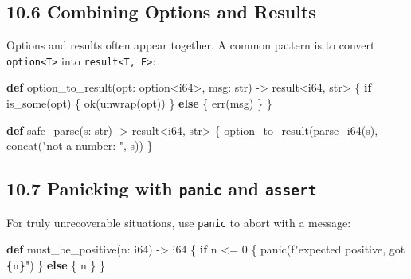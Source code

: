 \documentclass[
  english,
]{book}
\newenvironment{Shaded}{\begin{snugshade}}{\end{snugshade}}
\newcommand{\ControlFlowTok}[1]{\textcolor[rgb]{0.77,0.53,0.75}{\textbf{#1}}}
\newcommand{\DataTypeTok}[1]{\textcolor[rgb]{0.31,0.79,0.69}{#1}}
\newcommand{\DecValTok}[1]{\textcolor[rgb]{0.71,0.81,0.66}{#1}}
\newcommand{\FunctionTok}[1]{\textcolor[rgb]{0.86,0.86,0.67}{#1}}
\newcommand{\KeywordTok}[1]{\textcolor[rgb]{0.34,0.61,0.84}{\textbf{#1}}}
\newcommand{\NormalTok}[1]{\textcolor[rgb]{0.83,0.83,0.83}{#1}}
\newcommand{\OperatorTok}[1]{\textcolor[rgb]{0.83,0.83,0.83}{#1}}
\newcommand{\StringTok}[1]{\textcolor[rgb]{0.81,0.57,0.47}{#1}}
\begin{document}
\subsection{10.6 Combining Options and
Results}\label{combining-options-and-results}

Options and results often appear together. A common pattern is to
convert \texttt{option\textless{}T\textgreater{}} into
\texttt{result\textless{}T,\ E\textgreater{}}:

\begin{Shaded}
\begin{Highlighting}[]
\KeywordTok{def}\NormalTok{ option\_to\_result(opt: }\DataTypeTok{option}\OperatorTok{\textless{}}\DataTypeTok{i64}\OperatorTok{\textgreater{}}\NormalTok{, msg: }\DataTypeTok{str}\NormalTok{) }\OperatorTok{{-}\textgreater{}} \DataTypeTok{result}\OperatorTok{\textless{}}\DataTypeTok{i64}\NormalTok{, }\DataTypeTok{str}\OperatorTok{\textgreater{}}\NormalTok{ \{}
    \ControlFlowTok{if} \FunctionTok{is\_some}\NormalTok{(opt) \{}
        \FunctionTok{ok}\NormalTok{(unwrap(opt))}
\NormalTok{    \} }\ControlFlowTok{else}\NormalTok{ \{}
        \FunctionTok{err}\NormalTok{(msg)}
\NormalTok{    \}}
\NormalTok{\}}

\KeywordTok{def}\NormalTok{ safe\_parse(s: }\DataTypeTok{str}\NormalTok{) }\OperatorTok{{-}\textgreater{}} \DataTypeTok{result}\OperatorTok{\textless{}}\DataTypeTok{i64}\NormalTok{, }\DataTypeTok{str}\OperatorTok{\textgreater{}}\NormalTok{ \{}
\NormalTok{    option\_to\_result(}\FunctionTok{parse\_i64}\NormalTok{(s), }\FunctionTok{concat}\NormalTok{(}\StringTok{"not a number: "}\NormalTok{, s))}
\NormalTok{\}}
\end{Highlighting}
\end{Shaded}

\subsection{\texorpdfstring{10.7 Panicking with \texttt{panic} and
\texttt{assert}}{10.7 Panicking with panic and assert}}\label{panicking-with-panic-and-assert}

For truly unrecoverable situations, use \texttt{panic} to abort with a
message:

\begin{Shaded}
\begin{Highlighting}[]
\KeywordTok{def}\NormalTok{ must\_be\_positive(n: }\DataTypeTok{i64}\NormalTok{) }\OperatorTok{{-}\textgreater{}} \DataTypeTok{i64}\NormalTok{ \{}
    \ControlFlowTok{if}\NormalTok{ n }\OperatorTok{\textless{}=} \DecValTok{0}\NormalTok{ \{}
        \FunctionTok{panic}\NormalTok{(}\StringTok{f"expected positive, got }\ControlFlowTok{\{}\NormalTok{n}\ControlFlowTok{\}}\StringTok{"}\NormalTok{)}
\NormalTok{    \} }\ControlFlowTok{else}\NormalTok{ \{}
\NormalTok{        n}
\NormalTok{    \}}
\NormalTok{\}}
\end{Highlighting}
\end{Shaded}
\end{document}
